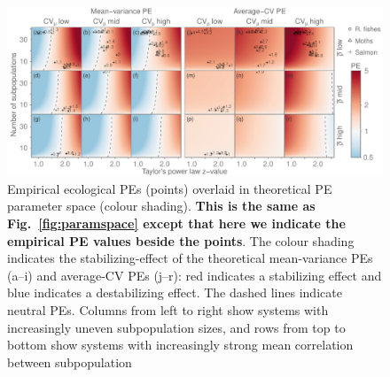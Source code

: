 \begin{figure}[htbp]
  \centering
  \includegraphics[width=\textwidth]{prophets/PE-parameter-space-labels-20120614.pdf}
  \caption{Empirical ecological PEs (points) overlaid in theoretical PE
    parameter space (colour shading). \textbf{This is the same as
    Fig.~\ref{fig:paramspace} except that here we indicate the empirical PE values
      beside the points}. The colour shading indicates the
    stabilizing-effect of the theoretical mean-variance PEs (a--i) and
    average-CV PEs (j--r): red indicates a stabilizing effect and blue indicates
    a destabilizing effect.
    The dashed lines indicate neutral PEs. Columns from left to right
    show systems with increasingly uneven subpopulation sizes,
    and rows from top to bottom show systems with increasingly strong mean
    correlation between subpopulation
}
\label{fig:paramspace-labels}
\end{figure}
\clearpage

